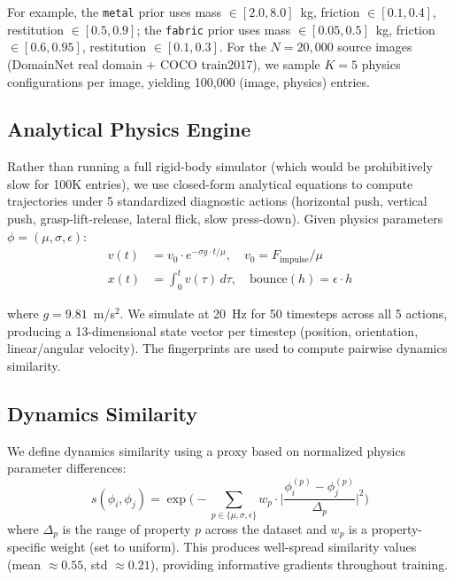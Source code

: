 \documentclass{article}
\begin{document}
For example, the \texttt{metal} prior uses mass $\in [2.0, 8.0]$~kg, friction $\in [0.1, 0.4]$, restitution $\in [0.5, 0.9]$; the \texttt{fabric} prior uses mass $\in [0.05, 0.5]$~kg, friction $\in [0.6, 0.95]$, restitution $\in [0.1, 0.3]$. For the $N{=}20{,}000$ source images (DomainNet real domain + COCO train2017), we sample $K{=}5$ physics configurations per image, yielding 100,000 (image, physics) entries.


\subsection{Analytical Physics Engine}
\label{sec:engine}

Rather than running a full rigid-body simulator (which would be prohibitively slow for 100K entries), we use closed-form analytical equations to compute trajectories under 5 standardized diagnostic actions (horizontal push, vertical push, grasp-lift-release, lateral flick, slow press-down). Given physics parameters $\phi = (\mu, \sigma, \epsilon)$:
\begin{align}
    v(t) &= v_0 \cdot e^{-\sigma g \cdot t / \mu}, \quad v_0 = F_{\text{impulse}} / \mu \label{eq:velocity} \\
    x(t) &= \int_0^t v(\tau) \, d\tau, \quad \text{bounce}(h) = \epsilon \cdot h \label{eq:position}
\end{align}

where $g = 9.81$~m/s$^2$. We simulate at 20~Hz for 50 timesteps across all 5 actions, producing a 13-dimensional state vector per timestep (position, orientation, linear/angular velocity). The fingerprints are used to compute pairwise dynamics similarity.


\subsection{Dynamics Similarity}
\label{sec:similarity}

We define dynamics similarity using a proxy based on normalized physics parameter differences:
\begin{equation}
    s(\phi_i, \phi_j) = \exp\!\bigg(-\sum_{p \in \{\mu,\sigma,\epsilon\}} w_p \cdot \bigg|\frac{\phi_i^{(p)} - \phi_j^{(p)}}{\Delta_p}\bigg|^2\bigg)
    \label{eq:proxy_sim}
\end{equation}
where $\Delta_p$ is the range of property $p$ across the dataset and $w_p$ is a property-specific weight (set to uniform). This produces well-spread similarity values (mean $\approx 0.55$, std $\approx 0.21$), providing informative gradients throughout training.
\end{document}
